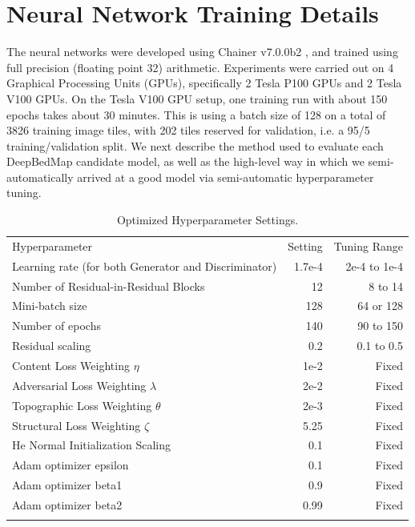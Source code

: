 \documentclass[tc, manuscript]{copernicus}
\begin{document}
\section{Neural Network Training Details} \label{appendix:B}

The neural networks were developed using Chainer v7.0.0b2 \citep{TokuiChainerDeepLearning2019}, and trained using full precision (floating point 32) arithmetic.
Experiments were carried out on 4 Graphical Processing Units (GPUs), specifically 2 Tesla P100 GPUs and 2 Tesla V100 GPUs.
On the Tesla V100 GPU setup, one training run with about 150 epochs takes about 30 minutes.
This is using a batch size of 128 on a total of 3826 training image tiles, with 202 tiles reserved for validation, i.e. a 95/5 training/validation split.
We next describe the method used to evaluate each DeepBedMap candidate model, as well as the high-level way in which we semi-automatically arrived at a good model via semi-automatic hyperparameter tuning.

\begin{table}[htbp]
  \caption{Optimized Hyperparameter Settings.}
  \label{table:B1}
  \begin{tabular}{lrr}
  \tophline
  Hyperparameter & Setting & Tuning Range \\
  \middlehline
  Learning rate (for both Generator and Discriminator) & 1.7e-4 & 2e-4 to 1e-4 \\
  Number of Residual-in-Residual Blocks & 12 & 8 to 14 \\
  Mini-batch size & 128 & 64 or 128 \\
  Number of epochs & 140 & 90 to 150 \\
  Residual scaling & 0.2 & 0.1 to 0.5 \\
  Content Loss Weighting $\eta$ & 1e-2 & Fixed \\
  Adversarial Loss Weighting $\lambda$ & 2e-2 & Fixed \\
  Topographic Loss Weighting $\theta$ & 2e-3 & Fixed \\
  Structural Loss Weighting $\zeta$ & 5.25 & Fixed \\
  He Normal Initialization Scaling & 0.1 & Fixed \\
  Adam optimizer epsilon & 0.1 & Fixed \\
  Adam optimizer beta1 & 0.9 & Fixed \\
  Adam optimizer beta2 & 0.99 & Fixed \\
  \bottomhline
  \end{tabular}
  \belowtable{} %
\end{table}
\end{document}
